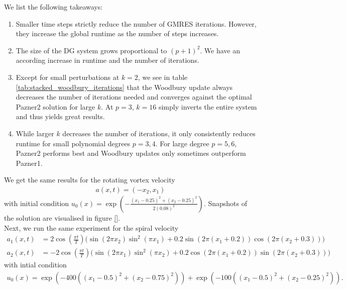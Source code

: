 \documentclass[12pt]{report}
\theoremstyle{remark}
\begin{document}
We list the following takeaways:
\begin{enumerate}
\item Smaller time steps strictly reduce the number of GMRES iterations. However, they increase the global runtime as the number of steps increases.

\item The size of the DG system grows proportional to $(p+1)^2$. We have an according increase in runtime and the number of iterations.

\item Except for small perturbations at $k = 2$, we see in table \ref{tab:stacked_woodbury_iterations} that the Woodbury update always decreases the number of iterations needed and converges against the optimal Pazner2 solution for large $k$. At $p = 3$, $k = 16$ simply inverts the entire system and thus yields great results.

\item While larger $k$ decreases the number of iterations, it only consistently reduces runtime for small polynomial degrees $p = 3, 4$. For large degree $p = 5, 6$, Pazner2 performs best and Woodbury updates only sometimes outperform Pazner1.
\end{enumerate}

We get the same results for the rotating vortex velocity
\begin{align*}
a(x, t) = (-x_2, x_1)
\end{align*}
with initial condition $u_0(x) = \exp\left( -\frac{(x_1 - 0.25)^2 + (x_2 - 0.25)^2}{2(0.08)^2} \right)$. Snapshots of the solution are visualised in figure \ref{}. \\

Next, we run the same experiment for the spiral velocity
\begin{align*}
    a_1(x, t) &= 2 \cos\left( \frac{\pi t}{T} \right) \Big( \sin(2\pi x_2) \sin^2(\pi x_1) + 0.2 \sin(2\pi(x_1 + 0.2)) \cos(2\pi(x_2 + 0.3)) \Big) \\
    a_2(x, t) &= -2 \cos\left( \frac{\pi t}{T} \right) \Big( \sin(2\pi x_1) \sin^2(\pi x_2) + 0.2 \cos(2\pi(x_1 + 0.2)) \sin(2\pi(x_2 + 0.3)) \Big)
\end{align*}
with intial condition
\begin{align*}
u_0(x) = \exp\left(-400 \left( (x_1 - 0.5)^2 + (x_2 - 0.75)^2 \right)\right) + \exp\left(-100 \left( (x_1 - 0.5)^2 + (x_2 - 0.25)^2 \right)\right).
\end{align*}
\end{document}
